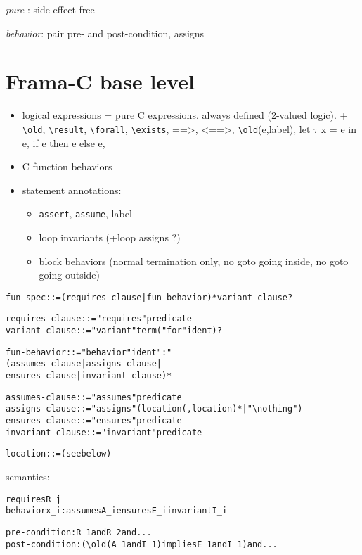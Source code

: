 \documentclass{article}
\newcommand{\assert}{\texttt{assert}}
\newcommand{\assume}{\texttt{assume}}
\newcommand{\Exists}{\texttt{{\textbackslash}exists}}
\newcommand{\Forall}{\texttt{{\textbackslash}forall}}
\newcommand{\nothing}{\texttt{{\textbackslash}nothing}}
\newcommand{\old}{\texttt{{\textbackslash}old}}
\newcommand{\result}{\texttt{{\textbackslash}result}}
\begin{document}
\emph{pure} : side-effect free

\emph{behavior}: pair pre- and post-condition, assigns

\section{Frama-C base level}

\begin{itemize}
\item logical expressions = pure C expressions. always defined
  (2-valued logic). + \old, \result, \Forall, \Exists, ==>, <==>,
  \old(e,label), let $\tau$ x = e in e, if e then e else e,
\item C function behaviors
\item statement annotations:
  \begin{itemize}
  \item \assert, \assume, label
  \item loop invariants (+loop assigns ?)
  \item block behaviors (normal termination only, no goto going
    inside, no goto going outside)
  \end{itemize}
\end{itemize}

\begin{alltt}
  fun-spec ::= (requires-clause | fun-behavior ) * variant-clause ?

  requires-clause ::= "requires" predicate
  variant-clause ::= "variant" term ("for" ident)?

  fun-behavior ::= "behavior" ident ":"
             (assumes-clause | assigns-clause |
              ensures-clause | invariant-clause) *

  assumes-clause ::= "assumes" predicate
  assigns-clause ::= "assigns" (location (, location) * | "\nothing")
  ensures-clause ::= "ensures" predicate
  invariant-clause ::= "invariant" predicate

  location ::= (see below)
\end{alltt}

semantics:

\begin{alltt}
  requires R_j
  behavior x_i: assumes A_i ensures E_i invariant I_i


 pre-condition : R_1 and R_2 and ...
 post-condition : (\old(A_1 and I_1) implies E_1 and I_1) and ...
\end{alltt}
\end{document}
